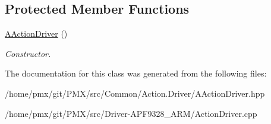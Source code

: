 \subsection*{Protected Member Functions}
\begin{DoxyCompactItemize}
\item 
\mbox{\label{classAActionDriver_af2fcbea774b20428f4824b4cf06092bb}} 
\hyperlink{classAActionDriver_af2fcbea774b20428f4824b4cf06092bb}{A\+Action\+Driver} ()
\begin{DoxyCompactList}\small\item\em Constructor. \end{DoxyCompactList}\end{DoxyCompactItemize}


The documentation for this class was generated from the following files\+:\begin{DoxyCompactItemize}
\item 
/home/pmx/git/\+P\+M\+X/src/\+Common/\+Action.\+Driver/A\+Action\+Driver.\+hpp\item 
/home/pmx/git/\+P\+M\+X/src/\+Driver-\/\+A\+P\+F9328\+\_\+\+A\+R\+M/Action\+Driver.\+cpp\end{DoxyCompactItemize}
